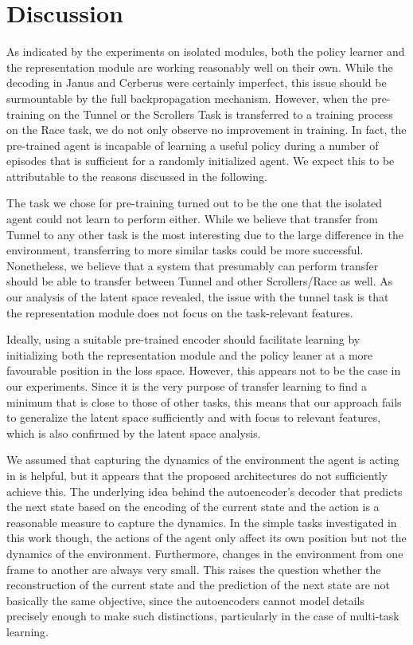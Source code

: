 \section{Discussion}
\label{sec:discussion}

As indicated by the experiments on isolated modules, both the policy learner and the representation module are working reasonably well on their own. While the decoding in Janus and Cerberus were certainly imperfect, this issue should be surmountable by the full backpropagation mechanism. However, when the pre-training on the Tunnel or the Scrollers Task is transferred to a training process on the Race task, we do not only observe no improvement in training. In fact, the pre-trained agent is incapable of learning a useful policy during a number of episodes that is sufficient for a randomly initialized agent. We expect this to be attributable to the reasons discussed in the following.

The task we chose for pre-training turned out to be the one that the isolated agent could not learn to perform either. While we believe that transfer from Tunnel to any other task is the most interesting due to the large difference in the environment, transferring to more similar tasks could be more successful. Nonetheless, we believe that a system that presumably can perform transfer should be able to transfer between Tunnel and other Scrollers/Race as well. As our analysis of the latent space revealed, the issue with the tunnel task is that the representation module does not focus on the task-relevant features.

Ideally, using a suitable pre-trained encoder should facilitate learning by initializing both the representation module and the policy leaner at a more favourable position in the loss space. However, this appears not to be the case in our experiments. Since it is the very purpose of transfer learning to find a minimum that is close to those of other tasks, this means that our approach fails to generalize the latent space sufficiently and with focus to relevant features, which is also confirmed by the latent space analysis. 

We assumed that capturing the dynamics of the environment the agent is acting in is helpful, but it appears that the proposed architectures do not sufficiently achieve this. The underlying idea behind the autoencoder's decoder that predicts the next state based on the encoding of the current state and the action is a reasonable measure to capture the dynamics. In the simple tasks investigated in this work though, the actions of the agent only affect its own position but not the dynamics of the environment. Furthermore, changes in the environment from one frame to another are always very small. This raises the question whether the reconstruction of the current state and the prediction of the next state are not basically the same objective, since the autoencoders cannot model details precisely enough to make such distinctions, particularly in the case of multi-task learning.

